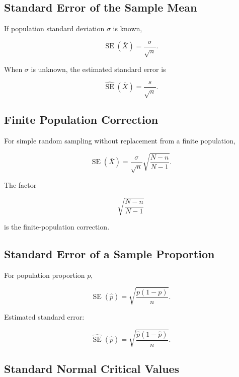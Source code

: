 \subsection{Standard Error of the Sample Mean}
\label{subsec:standard-error-mean}

If population standard deviation \(\sigma\) is known,

\[
\boxed{
\operatorname{SE}(\bar X)
=
\frac{
\sigma
}{
\sqrt n
}.
}
\]

When \(\sigma\) is unknown, the estimated standard error is

\[
\boxed{
\widehat{\operatorname{SE}}(\bar X)
=
\frac{
s
}{
\sqrt n
}.
}
\]

\subsection{Finite Population Correction}
\label{subsec:finite-population-correction}

For simple random sampling without replacement from a finite population,

\[
\boxed{
\operatorname{SE}(\bar X)
=
\frac{
\sigma
}{
\sqrt n
}
\sqrt{
\frac{
N-n
}{
N-1
}
}.
}
\]

The factor

\[
\boxed{
\sqrt{
\frac{
N-n
}{
N-1
}
}
}
\]

is the finite-population correction.

\subsection{Standard Error of a Sample Proportion}
\label{subsec:standard-error-proportion}

For population proportion \(p\),

\[
\boxed{
\operatorname{SE}(\hat p)
=
\sqrt{
\frac{
p(1-p)
}{
n
}
}.
}
\]

Estimated standard error:

\[
\boxed{
\widehat{\operatorname{SE}}(\hat p)
=
\sqrt{
\frac{
\hat p(1-\hat p)
}{
n
}
}.
}
\]

\subsection{Standard Normal Critical Values}
\label{subsec:standard-normal-critical-values}

